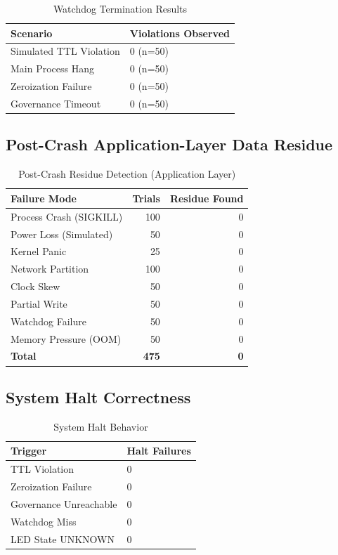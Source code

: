 \documentclass[conference]{IEEEtran}
\begin{document}
\begin{table}[h]
\caption{Watchdog Termination Results}
\centering
\begin{tabular}{l l}
\toprule
\textbf{Scenario} & \textbf{Violations Observed} \\
\midrule
Simulated TTL Violation & 0 (n=50) \\
Main Process Hang & 0 (n=50) \\
Zeroization Failure & 0 (n=50) \\
Governance Timeout & 0 (n=50) \\
\bottomrule
\end{tabular}
\label{tab:watchdog}
\end{table}

\subsection{Post-Crash Application-Layer Data Residue}

\begin{table}[h]
\caption{Post-Crash Residue Detection (Application Layer)}
\centering
\begin{tabular}{l r r}
\toprule
\textbf{Failure Mode} & \textbf{Trials} & \textbf{Residue Found} \\
\midrule
Process Crash (SIGKILL) & 100 & 0 \\
Power Loss (Simulated) & 50 & 0 \\
Kernel Panic & 25 & 0 \\
Network Partition & 100 & 0 \\
Clock Skew & 50 & 0 \\
Partial Write & 50 & 0 \\
Watchdog Failure & 50 & 0 \\
Memory Pressure (OOM) & 50 & 0 \\
\textbf{Total} & \textbf{475} & \textbf{0} \\
\bottomrule
\end{tabular}
\label{tab:residue}
\end{table}

\subsection{System Halt Correctness}

\begin{table}[h]
\caption{System Halt Behavior}
\centering
\begin{tabular}{l l}
\toprule
\textbf{Trigger} & \textbf{Halt Failures} \\
\midrule
TTL Violation & 0 \\
Zeroization Failure & 0 \\
Governance Unreachable & 0 \\
Watchdog Miss & 0 \\
LED State UNKNOWN & 0 \\
\bottomrule
\end{tabular}
\label{tab:halt}
\end{table}
\end{document}
